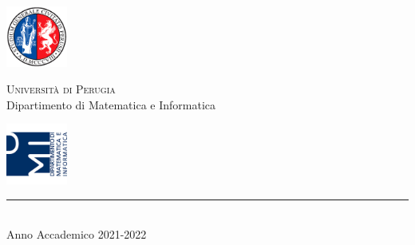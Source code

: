 
\thispagestyle{empty} %

	\noindent %
	\includegraphics[width=0.15\textwidth]{img/logoUniPg}
	\begin{minipage}[b]{0.7\textwidth}
		\centering
		{\Large {\textsc{Universit{\`a} di Perugia}}}\\
		\vspace{0.4 em}
		{\large {Dipartimento di Matematica e Informatica}}
		\vspace{0.6 em}
	\end{minipage}%
	\includegraphics[width=0.15\textwidth]{img/logoDMI}
	
	\vspace{5 em}

	\begin{center}
		
		{\large {\textsc{\esame}}} %
		\vspace{8 em}
		
		{\Huge {\titolo}} %
		\vspace{10 em}
		
		
		\vspace{6 em}
		\vfill
		
	    {\rule{380pt}{.4pt}}\\
		\vspace{1.2 em}
		\large{{Anno Accademico 2021-2022}} %
		
		
		
		
	\end{center}


